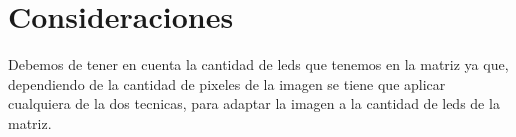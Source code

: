 \documentclass{article}
\begin{document}
    \vspace*{0.1cm}
    
\section{Consideraciones}
\label{consideraciones}
    \begin{flushleft}
        Debemos de tener en cuenta la cantidad de leds que tenemos en la matriz ya que, dependiendo de la cantidad de pixeles de la imagen se tiene que aplicar cualquiera de la dos tecnicas, para adaptar la imagen a la cantidad de leds de la matriz.   
    \end{flushleft}
    

\vfill
\vspace*{0.5cm}

\end{document}

